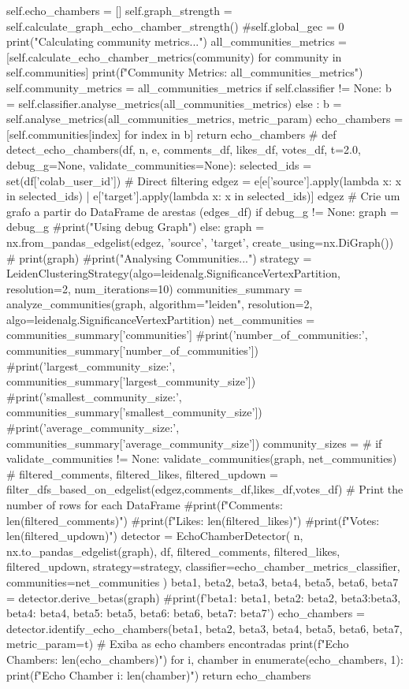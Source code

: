 \begin{codigo}[caption={Exemplo de classe Python para deteção de câmaras de eco}, label={codigo:echochamberdetector}, language=Python, breaklines=true]
        self.echo_chambers = []
        self.graph_strength = self.calculate_graph_echo_chamber_strength()
        #self.global_gec = 0
        print("Calculating community metrics...")
        all_communities_metrics = [self.calculate_echo_chamber_metrics(community) for community in self.communities]
        print(f"Community Metrics: {all_communities_metrics}")
        self.community_metrics = all_communities_metrics
        if self.classifier != None:
          b = self.classifier.analyse_metrics(all_communities_metrics)
        else :
          b = self.analyse_metrics(all_communities_metrics, metric_param)
        echo_chambers = [self.communities[index] for index in b]
        return echo_chambers
#
def detect_echo_chambers(df, n, e, comments_df, likes_df, votes_df, t=2.0, debug_g=None, validate_communities=None):
  selected_ids = set(df['colab_user_id'])
  # Direct filtering
  edgez = e[e['source'].apply(lambda x: x in selected_ids) | e['target'].apply(lambda x: x in selected_ids)]
  edgez
  # Crie um grafo a partir do DataFrame de arestas (edges_df)
  if debug_g != None:
    graph = debug_g
    #print("Using debug Graph")
  else:
    graph = nx.from_pandas_edgelist(edgez, 'source', 'target', create_using=nx.DiGraph())
  #
  print(graph)
  #print("Analysing Communities...")
  strategy = LeidenClusteringStrategy(algo=leidenalg.SignificanceVertexPartition, resolution=2, num_iterations=10)
  communities_summary = analyze_communities(graph, algorithm="leiden", resolution=2, algo=leidenalg.SignificanceVertexPartition)
  net_communities = communities_summary['communities']
  #print('number_of_communities:', communities_summary['number_of_communities'])
  #print('largest_community_size:', communities_summary['largest_community_size'])
  #print('smallest_community_size:', communities_summary['smallest_community_size'])
  #print('average_community_size:', communities_summary['average_community_size'])
  community_sizes = {}
  #
  if validate_communities != None:
    validate_communities(graph, net_communities)
  #
  filtered_comments, filtered_likes, filtered_updown = filter_dfs_based_on_edgelist(edgez,comments_df,likes_df,votes_df)
  # Print the number of rows for each DataFrame
  #print(f"Comments: {len(filtered_comments)}")
  #print(f"Likes: {len(filtered_likes)}")
  #print(f"Votes: {len(filtered_updown)}")
  detector = EchoChamberDetector(
    n, nx.to_pandas_edgelist(graph), df, filtered_comments, filtered_likes, filtered_updown,
    strategy=strategy,
    classifier=echo_chamber_metrics_classifier,
    communities=net_communities
  )
  beta1, beta2, beta3, beta4, beta5, beta6, beta7 = detector.derive_betas(graph)
  #print(f'beta1: {beta1}, beta2: {beta2}, beta3:{beta3}, beta4: {beta4}, beta5: {beta5}, beta6: {beta6}, beta7: {beta7}')
  echo_chambers = detector.identify_echo_chambers(beta1, beta2, beta3, beta4, beta5, beta6, beta7, metric_param=t)
  # Exiba as echo chambers encontradas
  print(f"Echo Chambers: {len(echo_chambers)}")
  for i, chamber in enumerate(echo_chambers, 1):
      print(f"Echo Chamber {i}: {len(chamber)}")
  return echo_chambers
\end{codigo}